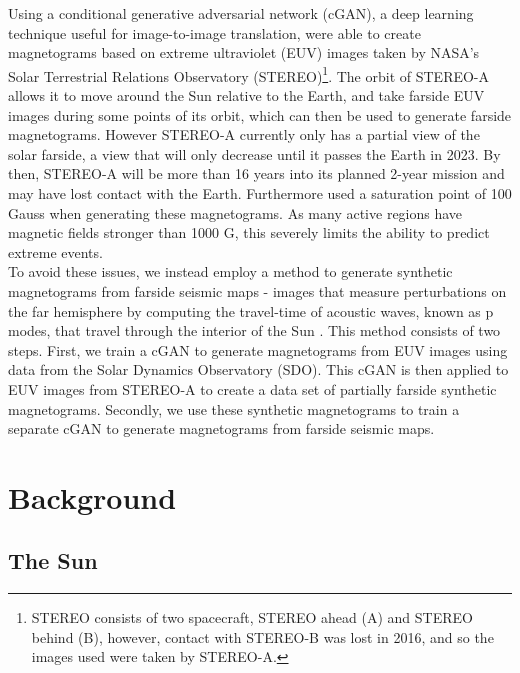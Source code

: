 \documentclass[11pt,a4paper,onecolumn]{report}
\begin{document}
Using a conditional generative adversarial network (cGAN), a deep learning
technique useful for image-to-image translation, \citet{Kim2019} were able to
create magnetograms based on extreme ultraviolet (EUV) images taken by NASA's
Solar Terrestrial Relations Observatory (STEREO)\footnote{STEREO
consists of two spacecraft, STEREO ahead (A) and STEREO behind (B), however,
contact with STEREO-B was lost in 2016, and so the images used were taken by
STEREO-A.}. The orbit of STEREO-A allows it to move around the Sun relative to
the Earth, and take farside EUV images during some points of its orbit,
which can then be used to generate farside magnetograms. However STEREO-A
currently only has a partial view of the solar farside, a view that will only decrease
until it passes the Earth in 2023. By then, STEREO-A will be more than 16 years
into its planned 2-year mission and may have lost contact with the Earth.
Furthermore \citet{Kim2019} used a saturation point of 100 Gauss when generating
these magnetograms. As many active regions have magnetic fields stronger than
1000 G, this severely limits the ability to predict extreme events.\\


To avoid these issues, we instead employ a method to generate synthetic
magnetograms from farside seismic maps - images that measure perturbations on
the far hemisphere by computing the travel-time of acoustic waves, known as
p modes, that travel through the interior of the Sun \citep{Lindsey2017}. This
method consists of two steps. First, we train a cGAN to generate magnetograms
from EUV images using data from the Solar Dynamics Observatory (SDO). This cGAN
is then applied to EUV images from STEREO-A to create a data set of partially
farside synthetic magnetograms. Secondly, we use these synthetic magnetograms to
train a separate cGAN to generate magnetograms from farside seismic maps.





%
%
%
%
%
%
\chapter{Background}
%
%
%
%
%
%


%
%
%
%
%
%

\section{The Sun}
\label{sec:Sun}
\end{document}
